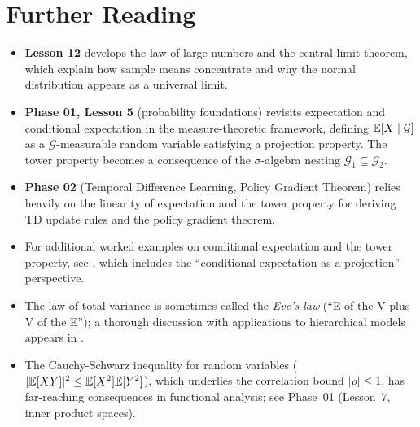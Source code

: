 \documentclass[11pt,a4paper]{article}
\begin{document}
\section{Further Reading}
\label{sec:further_reading}

\begin{itemize}
    \item \textbf{Lesson 12} develops the law of large numbers and the
    central limit theorem, which explain how sample means concentrate
    and why the normal distribution appears as a universal limit.
    \item \textbf{Phase 01, Lesson 5} (probability foundations) revisits
    expectation and conditional expectation in the measure-theoretic
    framework, defining $\mathbb{E}[X \mid \mathcal{G}]$ as a
    $\mathcal{G}$-measurable random variable satisfying a projection
    property. The tower property becomes a consequence of the
    $\sigma$-algebra nesting $\mathcal{G}_1 \subseteq \mathcal{G}_2$.
    \item \textbf{Phase 02} (Temporal Difference Learning, Policy
    Gradient Theorem) relies heavily on the linearity of expectation
    and the tower property for deriving TD update rules and the
    policy gradient theorem.
    \item For additional worked examples on conditional expectation and
    the tower property, see \citet[Chapter 9]{blitzstein2019}, which
    includes the ``conditional expectation as a projection''
    perspective.
    \item The law of total variance is sometimes called the
    \emph{Eve's law} (``E of the V plus V of the E''); a thorough
    discussion with applications to hierarchical models appears in
    \citet[Section 4.4]{bertsekas2008}.
    \item The Cauchy-Schwarz inequality for random variables
    ($|\mathbb{E}[XY]|^2 \leq \mathbb{E}[X^2]\mathbb{E}[Y^2]$), which underlies the
    correlation bound $|\rho| \leq 1$, has far-reaching consequences
    in functional analysis; see Phase~01 (Lesson~7, inner product
    spaces).
\end{itemize}


\end{document}
